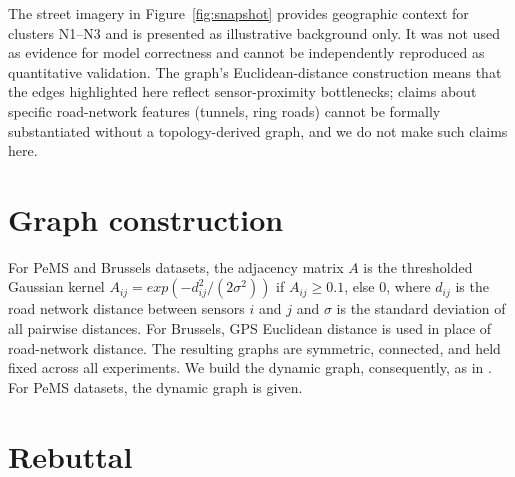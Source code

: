 \documentclass{article}
\theoremstyle{plain}
\theoremstyle{definition}
\theoremstyle{remark}
\begin{document}
The street imagery in Figure~\ref{fig:snapshot} provides geographic context for
clusters N1–N3 and is presented as illustrative background only. It was not used as
evidence for model correctness and cannot be independently reproduced as quantitative
validation. The graph's Euclidean-distance construction means that the edges
highlighted here reflect sensor-proximity bottlenecks; claims about specific
road-network features (tunnels, ring roads) cannot be formally substantiated
without a topology-derived graph, and we do not make such claims here.

\section{Graph construction}\label{graph_cons}
For PeMS and Brussels datasets, the adjacency matrix $A$ is the thresholded Gaussian kernel $A_{ij} = exp(-d_{ij}^2 / (2\sigma^2))$ if $A_{ij} \geq 0.1$, else 0, where $d_{ij}$ is the road network distance between sensors $i$ and $j$ and $\sigma$ is the standard deviation of all pairwise distances. For Brussels, GPS Euclidean distance is used in place of road-network distance. The resulting graphs are symmetric, connected, and held fixed across all experiments. We build the dynamic graph, consequently, as in \cite{sym17071007}. For PeMS datasets, the dynamic graph is given.



\section{Rebuttal}

\newcommand{\tbd}{\textcolor{gray}{\texttt{0.XXXX}}}   %
\end{document}
